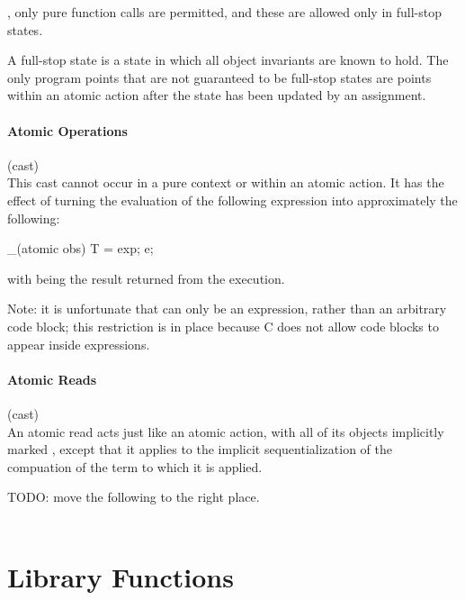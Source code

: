 \documentclass[preprint,nocopyrightspace]{sigplanconf}
\newcommand{\subsubsubsection}[1]{\paragraph{#1}}
\begin{document}
{{{, only pure function calls are permitted, and 
these are allowed only in full-stop states. 

A full-stop state is a state in which all object invariants are known
to hold. The only program points that are not guaranteed to be
full-stop states are points within an atomic action after the state
has been updated by an assignment.

\subsubsubsection{Atomic Operations}

\noindent{} (cast)\\
This cast cannot occur in a pure context or within an atomic action.
It has the effect of turning the evaluation of the following
expression  into approximately the following:
\begin{VCC}
_(atomic obs) {
  T \result = exp;
  e;
}
\end{VCC}
with \vcc{\result} being the result returned from the execution. 

Note: it is unfortunate that  can only be an expression, rather
than an arbitrary code block; this restriction is in place because C
does not allow code blocks to appear inside expressions. 

\subsubsubsection{Atomic Reads}

 (cast)\\
An atomic read acts just like an atomic action, with all of its
objects implicitly marked , except that it applies
to the implicit sequentialization of the compuation of the term to
which it is applied.

TODO: move the following to the right place.
\\
\\


\section{Library Functions}

}}}
\end{document}
